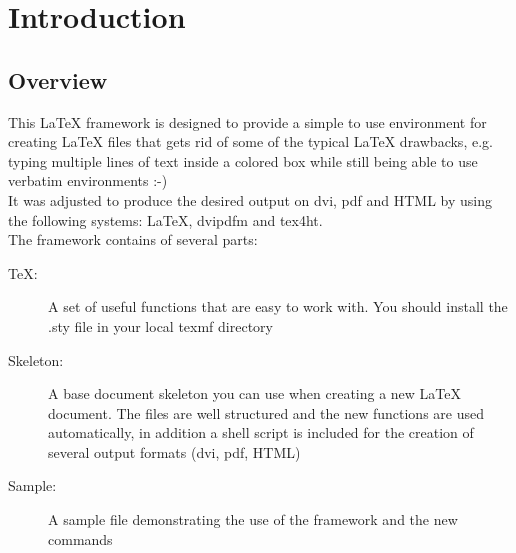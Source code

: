 \section{Introduction}


\subsection{Overview}
This LaTeX framework is designed to provide a simple to use environment for creating LaTeX files
that gets rid of some of the typical LaTeX drawbacks, e.g. typing multiple lines of text inside
a colored box while still being able to use verbatim environments :-)\\
It was adjusted to produce the desired output on dvi, pdf and \ac{HTML} by using the following
systems: LaTeX, dvipdfm and tex4ht.
\\

\noindent
The framework contains of several parts:
\begin{description}
\item[TeX:]
A set of useful functions that are easy to work with. You should install the .sty file
in your local texmf directory
\item[Skeleton:]
A base document skeleton you can use when creating a new LaTeX document. The files are
well structured and the new functions are used automatically, in addition a shell
script is included for the creation of several output formats (dvi, pdf, \ac{HTML})
\item[Sample:]
A sample file demonstrating the use of the framework and the new commands
\end{description}